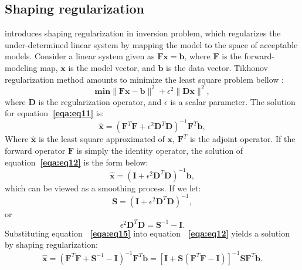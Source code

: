 \subsection{Shaping regularization}
\citet[]{shape,lpf} introduces shaping regularization in inversion problem, 
which regularizes the under-determined linear system by mapping the model
to the space of acceptable models.
Consider a linear system given as $\mathbf{Fx = \mathbf{b}}$,
where $\mathbf{F}$ is the forward-modeling map, $\mathbf{x}$
is the model vector, and $\mathbf{b}$ is the data vector.
Tikhonov regularization method amounts to minimize the least square problem bellow 
\cite[]{tikhonov}:
\begin{equation}
    \label{eqa:eq11}
    \mathbf{min} \|\mathbf{Fx}-\mathbf{b}\|^2+\epsilon^2\|\mathbf{Dx}\|^2,
\end{equation}
where $\mathbf{D}$ is the regularization operator, and $\epsilon$ is a scalar parameter.
The solution for equation\textbf{~\ref{eqa:eq11}} is:
\begin{equation}
    \label{eqa:eq12}
    \mathbf{\hat{x}} = \left(\mathbf{F}^T\mathbf{F}+\epsilon^2 \mathbf{D}^T\mathbf{D}\right)^{-1}\mathbf{F}^T\mathbf{b},
\end{equation}
Where $\mathbf{\hat{x}}$ is the least square approximated of $\mathbf{x}$, $\mathbf{F}^T$
is the adjoint operator.
If the forward operator $\mathbf{F}$ is simply the identity operator, the solution of 
equation\textbf{~\ref{eqa:eq12}} is the form below:
\begin{equation}
    \label{eqa:eq13}
    \mathbf{\hat{x}} = \left(\mathbf{I}+\epsilon^2 \mathbf{D}^T\mathbf{D}\right)^{-1}\mathbf{b},
\end{equation}
which can be viewed as a smoothing process. If we let:
\begin{equation}
    \label{eqa:eq14}
    \mathbf{S} = \left(\mathbf{I}+\epsilon^2 \mathbf{D}^T\mathbf{D}\right)^{-1},
\end{equation}
or 
\begin{equation}
    \label{eqa:eq15}
    \epsilon^2 \mathbf{D}^T\mathbf{D} = \mathbf{S}^{-1} - \mathbf{I}.
\end{equation}
Substituting equation \textbf{~\ref{eqa:eq15}} into equation \textbf{~\ref{eqa:eq12}}
yields a solution by shaping regularization:
\begin{equation}
    \label{eqa:eq16}
    \mathbf{\hat{x}} = \left(\mathbf{F}^T\mathbf{F}+\mathbf{S}^{-1}-\mathbf{I}\right)^{-1}\mathbf{F}^T\mathbf{b}
     = \left[\mathbf{I} + \mathbf{S}\left(\mathbf{F}^T\mathbf{F}-\mathbf{I}\right)\right]^{-1}\mathbf{SF}^T\mathbf{b}.
\end{equation}
